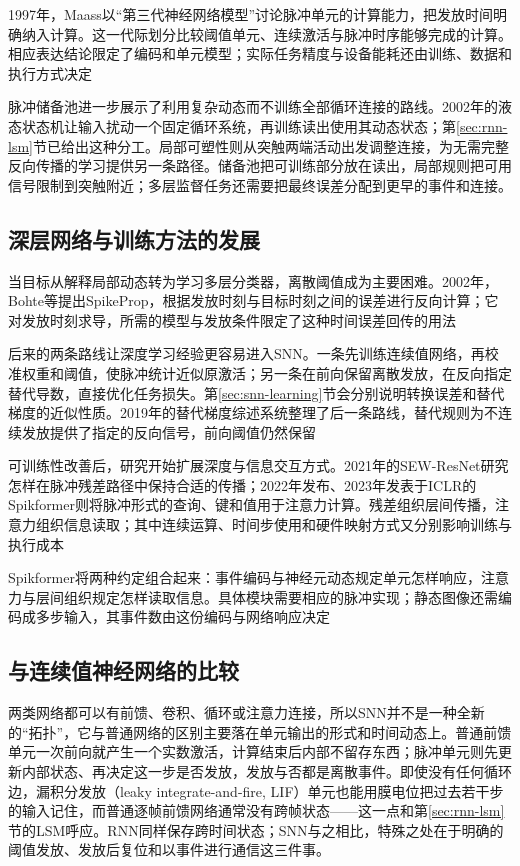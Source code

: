 1997年，Maass以“第三代神经网络模型”讨论脉冲单元的计算能力，把发放时间明确纳入计算。这一代际划分比较阈值单元、连续激活与脉冲时序能够完成的计算。相应表达结论限定了编码和单元模型；实际任务精度与设备能耗还由训练、数据和执行方式决定

脉冲储备池进一步展示了利用复杂动态而不训练全部循环连接的路线。2002年的液态状态机让输入扰动一个固定循环系统，再训练读出使用其动态状态；第\ref{sec:rnn-lsm}节已给出这种分工。局部可塑性则从突触两端活动出发调整连接，为无需完整反向传播的学习提供另一条路径。储备池把可训练部分放在读出，局部规则把可用信号限制到突触附近；多层监督任务还需要把最终误差分配到更早的事件和连接。

\subsection{深层网络与训练方法的发展}
\label{sec:snn-learning-history}

当目标从解释局部动态转为学习多层分类器，离散阈值成为主要困难。2002年，Bohte等提出SpikeProp，根据发放时刻与目标时刻之间的误差进行反向计算；它对发放时刻求导，所需的模型与发放条件限定了这种时间误差回传的用法

后来的两条路线让深度学习经验更容易进入SNN。一条先训练连续值网络，再校准权重和阈值，使脉冲统计近似原激活；另一条在前向保留离散发放，在反向指定替代导数，直接优化任务损失。第\ref{sec:snn-learning}节会分别说明转换误差和替代梯度的近似性质。2019年的替代梯度综述系统整理了后一条路线，替代规则为不连续发放提供了指定的反向信号，前向阈值仍然保留

可训练性改善后，研究开始扩展深度与信息交互方式。2021年的SEW-ResNet研究怎样在脉冲残差路径中保持合适的传播；2022年发布、2023年发表于ICLR的Spikformer则将脉冲形式的查询、键和值用于注意力计算。残差组织层间传播，注意力组织信息读取；其中连续运算、时间步使用和硬件映射方式又分别影响训练与执行成本

Spikformer将两种约定组合起来：事件编码与神经元动态规定单元怎样响应，注意力与层间组织规定怎样读取信息。具体模块需要相应的脉冲实现；静态图像还需编码成多步输入，其事件数由这份编码与网络响应决定

\subsection{与连续值神经网络的比较}
\label{sec:snn-ann-comparison}

两类网络都可以有前馈、卷积、循环或注意力连接，所以SNN并不是一种全新的“拓扑”，它与普通网络的区别主要落在单元输出的形式和时间动态上。普通前馈单元一次前向就产生一个实数激活，计算结束后内部不留存东西；脉冲单元则先更新内部状态、再决定这一步是否发放，发放与否都是离散事件。即使没有任何循环边，漏积分发放（leaky integrate-and-fire, LIF）单元也能用膜电位把过去若干步的输入记住，而普通逐帧前馈网络通常没有跨帧状态——这一点和第\ref{sec:rnn-lsm}节的LSM呼应。RNN同样保存跨时间状态；SNN与之相比，特殊之处在于明确的阈值发放、发放后复位和以事件进行通信这三件事。

